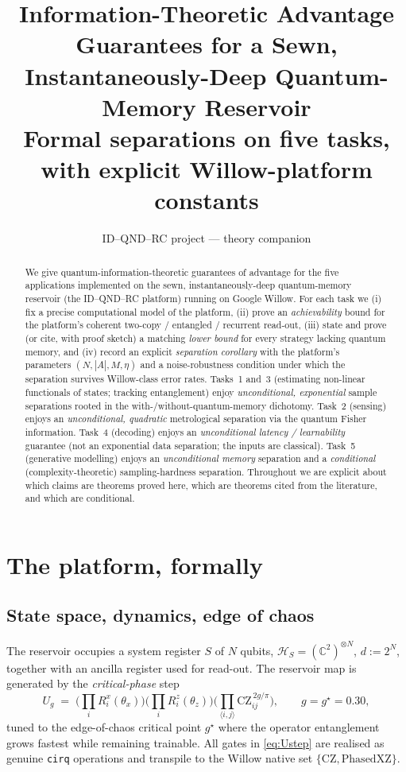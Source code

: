 \documentclass[11pt]{article}
\title{\textbf{Information-Theoretic Advantage Guarantees for a Sewn,\\
Instantaneously-Deep Quantum-Memory Reservoir}\\[4pt]
\large Formal separations on five tasks, with explicit Willow-platform constants}
\author{ID--QND--RC project --- theory companion}
\date{}
\theoremstyle{plain}
\theoremstyle{definition}
\theoremstyle{remark}
\newcommand{\Hs}{\mathcal{H}}
\newcommand{\code}[1]{\texttt{#1}}
\begin{document}
\maketitle

\begin{abstract}
We give quantum-information-theoretic guarantees of advantage for the five applications implemented on the sewn, instantaneously-deep quantum-memory reservoir (the ID--QND--RC platform) running on Google Willow. For each task we (i) fix a precise computational model of the platform, (ii) prove an \emph{achievability} bound for the platform's coherent two-copy / entangled / recurrent read-out, (iii) state and prove (or cite, with proof sketch) a matching \emph{lower bound} for every strategy lacking quantum memory, and (iv) record an explicit \emph{separation corollary} with the platform's parameters $(N,|A|,M,\eta)$ and a noise-robustness condition under which the separation survives Willow-class error rates. Tasks~1 and~3 (estimating non-linear functionals of states; tracking entanglement) enjoy \emph{unconditional, exponential} sample separations rooted in the with-/without-quantum-memory dichotomy. Task~2 (sensing) enjoys an \emph{unconditional, quadratic} metrological separation via the quantum Fisher information. Task~4 (decoding) enjoys an \emph{unconditional latency / learnability} guarantee (not an exponential data separation; the inputs are classical). Task~5 (generative modelling) enjoys an \emph{unconditional memory} separation and a \emph{conditional} (complexity-theoretic) sampling-hardness separation. Throughout we are explicit about which claims are theorems proved here, which are theorems cited from the literature, and which are conditional.
\end{abstract}

\tableofcontents

\section{The platform, formally}\label{sec:platform}

\subsection{State space, dynamics, edge of chaos}
The reservoir occupies a system register $S$ of $N$ qubits, $\Hs_S=(\mathbb C^2)^{\otimes N}$, $d:=2^N$, together with an ancilla register used for read-out. The reservoir map is generated by the \emph{critical-phase} step
\begin{equation}
U_{g}\;=\;\Big(\prod_{i} R^{x}_i(\theta_x)\Big)\Big(\prod_{i} R^{z}_i(\theta_z)\Big)\Big(\prod_{\langle i,j\rangle}\mathrm{CZ}_{ij}^{\,2g/\pi}\Big),
\qquad g=g^\star=0.30,
\label{eq:Ustep}
\end{equation}
tuned to the edge-of-chaos critical point $g^\star$ where the operator entanglement grows fastest while remaining trainable. All gates in \eqref{eq:Ustep} are realised as genuine \code{cirq} operations and transpile to the Willow native set $\{\mathrm{CZ},\mathrm{PhasedXZ}\}$.
\end{document}
